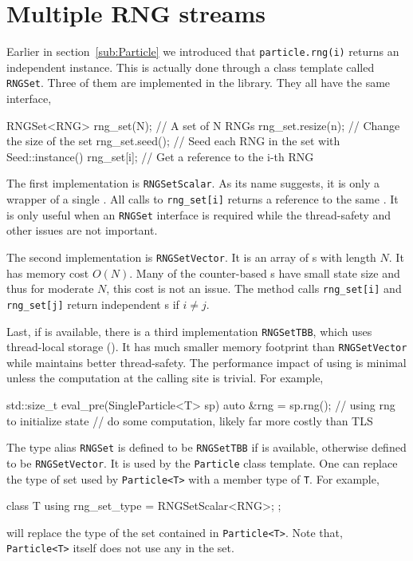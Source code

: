 \section{Multiple RNG streams}
\label{sec:Multiple RNG streams}

Earlier in section~\ref{sub:Particle} we introduced that \verb|particle.rng(i)|
returns an independent \rng instance. This is actually done through a class
template called \verb|RNGSet|. Three of them are implemented in the library.
They all have the same interface,
\begin{cppcode}
  RNGSet<RNG> rng_set(N); // A set of N RNGs
  rng_set.resize(n);      // Change the size of the set
  rng_set.seed();         // Seed each RNG in the set with Seed::instance()
  rng_set[i];             // Get a reference to the i-th RNG
\end{cppcode}
The first implementation is \verb|RNGSetScalar|. As its name suggests, it is
only a wrapper of a single \rng. All calls to \verb|rng_set[i]| returns a
reference to the same \rng. It is only useful when an \verb|RNGSet| interface
is required while the thread-safety and other issues are not important.

The second implementation is \verb|RNGSetVector|. It is an array of \rng{}s
with length $N$. It has memory cost $O(N)$. Many of the counter-based \rng{}s
have small state size and thus for moderate $N$, this cost is not an issue. The
method calls \verb|rng_set[i]| and \verb|rng_set[j]| return independent \rng{}s
if $i \ne j$.

Last, if \tbb is available, there is a third implementation \verb|RNGSetTBB|,
which uses thread-local storage (\tls). It has much smaller memory footprint
than \verb|RNGSetVector| while maintains better thread-safety. The performance
impact of using \tls is minimal unless the computation at the calling site is
trivial. For example,
\begin{cppcode}
  std::size_t eval_pre(SingleParticle<T> sp)
  {
      auto &rng = sp.rng();
      // using rng to initialize state
      // do some computation, likely far more costly than TLS
  }
\end{cppcode}
The type alias \verb|RNGSet| is defined to be \verb|RNGSetTBB| if \tbb is
available, otherwise defined to be \verb|RNGSetVector|. It is used by the
\verb|Particle| class template. One can replace the type of \rng set used by
\verb|Particle<T>| with a member type of \verb|T|. For example,
\begin{cppcode}
  class T
  {
      using rng_set_type = RNGSetScalar<RNG>;
  };
\end{cppcode}
will replace the type of the \rng set contained in \verb|Particle<T>|. Note
that, \verb|Particle<T>| itself does not use any \rng in the set.

